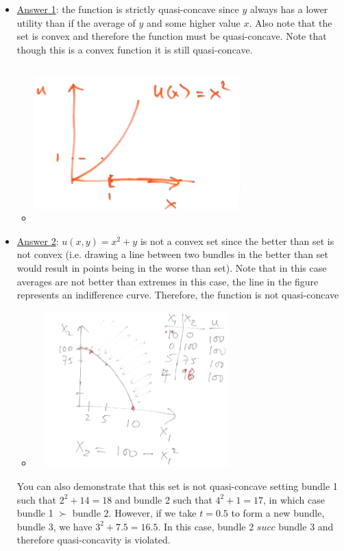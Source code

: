 \documentclass{article}
\begin{document}
  \begin{itemize}
    \item  \underline{Answer 1}: the function is strictly quasi-concave since $y$ always has a lower utility than if the average of $y$ and some higher value $x$. Also note that the set is convex and therefore the function must be quasi-concave. Note that though this is a convex function it is still quasi-concave.
    \begin{itemize}
      \item  \includegraphics[width=8cm, height=6cm]{pic19}
    \end{itemize}
    \item  \underline{Answer 2}: $u(x,y) = x^{2} + y$ is not a convex set since the better than set is not convex (i.e. drawing a line between two bundles in the better than set would result in points being in the worse than set). Note that in this case averages are not better than extremes in this case, the line in the figure represents an indifference curve. Therefore, the function is not quasi-concave
    \begin{itemize}
      \item  \includegraphics[width=8cm, height=6cm]{pic18}
    \end{itemize}
    You can also demonstrate that this set is not quasi-concave setting bundle 1 such that $2^{2} + 14 = 18$ and bundle 2 such that $4^2 + 1 = 17$, in which case bundle 1 $\succ$ bundle 2. However, if we take $t=0.5$ to form a new bundle, bundle 3, we have $3^{2} + 7.5 = 16.5$. In this case, bundle 2 $succ$ bundle 3 and therefore quasi-concavity is violated.
  \end{itemize}
  \par
\vspace{6mm}
\end{document}
